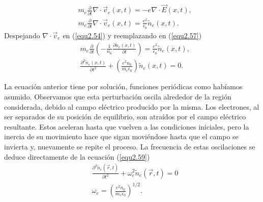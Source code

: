 \documentclass[../main.tex]{subfiles}
\begin{document}
        \begin{align}
            &m_e\frac{\partial}{\partial t}\nabla \cdot \vec{v}_e(x,t) = -e\nabla \cdot \vec{E}(x,t), \\
            &m_e\frac{\partial}{\partial t}\nabla \cdot \vec{v}_e(x,t) = \frac{e^2}{\epsilon_0}\tilde{n}_e(x,t). \label{equ2.57}
        \end{align}
    Despejando $\nabla \cdot \vec{v}_e$ en (\ref{equ2.54}) y reemplazando en (\ref{equ2.57})
        \begin{align}
            &m_e\frac{\partial}{\partial t}\left( -\frac{1}{n_0} \frac{\partial \tilde{n}_e(x,t)}{\partial t} \right) = \frac{e^2}{\epsilon_0}\tilde{n}_e(x,t), \\
            &\frac{\partial^2 \tilde{n}_e(x,t)}{\partial t^2} + \left( \frac{e^2n_0}{m_e\epsilon_0} \right) \tilde{n}_e(x,t) = 0. \label{equ2.59}
        \end{align}
        
    La ecuación anterior tiene por solución, funciones periódicas como habíamos asumido. Observamos que esta perturbación oscila alrededor de la región considerada, debido al campo eléctrico producido por la misma. Los electrones, al ser separados de su posición de equilibrio, son atraídos por el campo eléctrico resultante. Estos aceleran hasta que vuelven a las condiciones iniciales, pero la inercia de su movimiento hace que sigan moviéndose hasta que el campo se invierta y, nuevamente se repite el proceso. La frecuencia de estas oscilaciones se deduce directamente de la ecuación (\ref{equ2.59})
        \begin{align}
            &\frac{\partial^2 \tilde{n}_e(\vec{r},t)}{\partial t^2} + \omega_e^{2} \tilde{n}_e(\vec{r},t) = 0 \\
            &\omega_e = \left( \frac{e^2n_0}{m_e\epsilon_0} \right)^{1/2}.
        \end{align}
        
\end{document}
